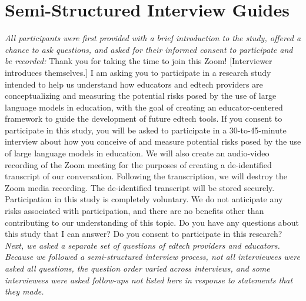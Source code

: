 \appendix

\section{Semi-Structured Interview Guides}\label{a-interview-guides}
\textit{All participants were first provided with a brief introduction to the study, offered a chance to ask questions, and asked for their informed consent to participate and be recorded:}
\newline\newline\noindent Thank you for taking the time to join this Zoom! [Interviewer introduces themselves.] I am asking you to participate in a research study intended to help us understand how educators and edtech providers are conceptualizing and measuring the potential risks posed by the use of large language models in education, with the goal of creating an educator-centered framework to guide the development of future edtech tools. If you consent to participate in this study, you will be asked to participate in a 30-to-45-minute interview about how you conceive of and measure potential risks posed by the use of large language models in education. We will also create an audio-video recording of the Zoom meeting for the purposes of creating a de-identified transcript of our conversation. Following the transcription, we will destroy the Zoom media recording. The de-identified transcript will be stored securely. Participation in this study is completely voluntary. We do not anticipate any risks associated with participation, and there are no benefits other than contributing to our understanding of this topic. Do you have any questions about this study that I can answer? Do you consent to participate in this research? 
\newline\newline\noindent \textit{Next, we asked a separate set of questions of edtech providers and educators. Because we followed a semi-structured interview process, not all interviewees were asked all questions, the question order varied across interviews, and some interviewees were asked follow-ups not listed here in response to statements that they made.}

